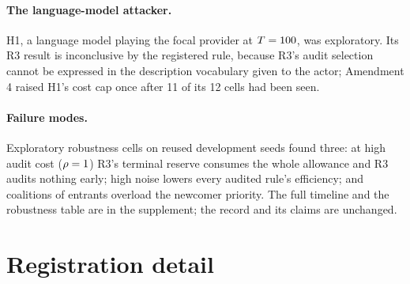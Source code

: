 \documentclass[11pt]{article}
\begin{document}
\paragraph{The language-model attacker.} H1, a language model playing the focal provider at $T = 100$, was exploratory. Its R3 result is inconclusive by the registered rule, because R3's audit selection cannot be expressed in the description vocabulary given to the actor; Amendment 4 raised H1's cost cap once after 11 of its 12 cells had been seen.

\paragraph{Failure modes.} Exploratory robustness cells on reused development seeds found three: at high audit cost ($\rho = 1$) R3's terminal reserve consumes the whole allowance and R3 audits nothing early; high noise lowers every audited rule's efficiency; and coalitions of entrants overload the newcomer priority. The full timeline and the robustness table are in the supplement; the record and its claims are unchanged.

\FloatBarrier
\section{Registration detail}\label{sec:app-design}
\end{document}
